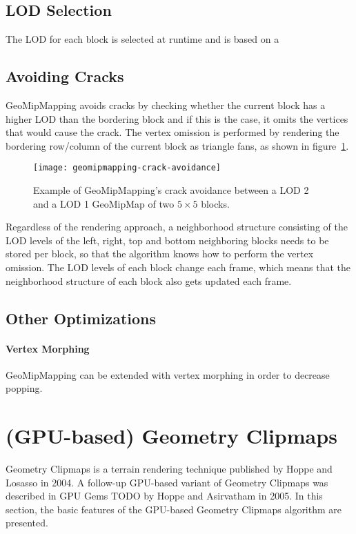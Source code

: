\subsection{LOD Selection}
The LOD for each block is selected at runtime and is based on a 

\subsection{Avoiding Cracks}
GeoMipMapping avoids cracks by checking whether the
current block has a higher LOD than the bordering block and if this is the case,
it omits the vertices that would cause the crack.
The vertex omission is performed by rendering the bordering row/column of the current block
as triangle fans, as shown in figure~\ref{fig:geomipmapping-crack-avoidance}.

\begin{figure}[H]
  \centering
  \texttt{[image: geomipmapping-crack-avoidance]}
  \caption{Example of GeoMipMapping's crack avoidance between a LOD 2 and a LOD 1 GeoMipMap of two $5 \times 5$ blocks.}\label{fig:geomipmapping-crack-avoidance}
\end{figure}

Regardless of the rendering approach, a neighborhood structure consisting of the LOD levels of the left, right, top and bottom 
neighboring blocks needs to be stored per block, so that the algorithm knows how to perform the vertex omission. The LOD levels of each block change each frame, which means 
that the neighborhood structure of each block also gets updated each frame.

\subsection{Other Optimizations}
\paragraph{Vertex Morphing}
GeoMipMapping can be extended with vertex morphing in order to decrease popping.

\section{(GPU-based) Geometry Clipmaps}
Geometry Clipmaps is a terrain rendering technique published by Hoppe and Losasso in 2004.
A follow-up GPU-based variant of Geometry Clipmaps was described in GPU Gems TODO by Hoppe and Asirvatham in 2005.
In this section, the basic features of the GPU-based Geometry Clipmaps algorithm are presented.

